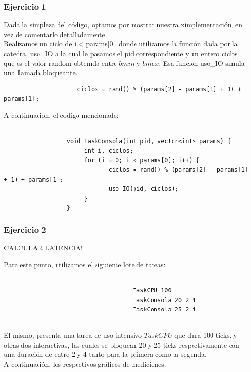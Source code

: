 \subsubsection[Resolución Ejercicio 1]{Ejercicio 1}

\indent Dada la simpleza del código, optamos por mostrar nuestra ximplementación, en vez de comentarlo detalladamente.\\
\indent Realizamos un ciclo de i < params[0], donde utilizamos la función dada por la catedra, uso\_IO a la cual le pasamos
el pid correspondiente y un entero ciclos que es el valor random obtenido entre $bmin$ y $bmax$. Esa función uso\_IO simula una llamada bloqueante.
\begin{center}
 \begin{verbatim}
                     ciclos = rand() % (params[2] - params[1] + 1) + params[1];
 \end{verbatim}

\end{center}

\indent A continuacion, el codigo mencionado:

\begin{verbatim}

                  void TaskConsola(int pid, vector<int> params) {
                       int i, ciclos;              
                       for (i = 0; i < params[0]; i++) {
                              ciclos = rand() % (params[2] - params[1] + 1) + params[1];  
                              uso_IO(pid, ciclos);
                       }
                  } 

\end{verbatim}

\subsubsection[Resolución Ejercicio 2]{Ejercicio 2}

CALCULAR LATENCIA!

\indent Para este punto, utilizamos el siguiente lote de tareas:
\begin{verbatim}
 
                                     TaskCPU 100
                                     TaskConsola 20 2 4
                                     TaskConsola 25 2 4


\end{verbatim}

\indent El mismo, presenta una tarea de uso intensivo $TaskCPU$ que dura 100 ticks, y otras dos interactivas, las cuales se
bloquean 20 y 25 ticks respectivamente con una duración de entre 2 y 4 tanto para la primera como la segunda.\\
A continuación, los respectivos gráficos de mediciones.


